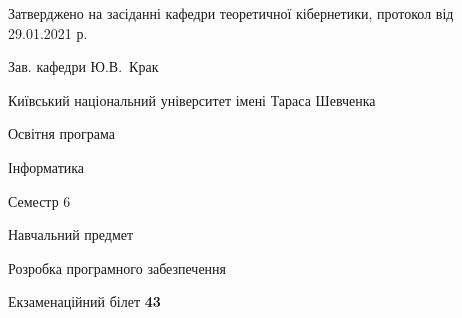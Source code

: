 \documentclass[10pt, ukrainian]{article}
\begin{document}
{\vspace{5mm}\smallskip \begin {small} Затверджено на засіданні кафедри теоретичної кібернетики, протокол  від   29.01.2021 р.\par\smallskip\smallskip
{\parbox {6.5 cm}{Зав. кафедри \dotfill Ю.В.~Крак}} \end{small}}
\newpage

{{\begin {small}\par
{ \center  Київський національний університет імені Тараса Шевченка \par}
{\parbox {5 cm}{Освітня програма \hfill}{\parbox {7 cm}{Інформатика \hfill}}\parbox {6 cm}{\hfill Семестр 6}}\par
{\parbox {5 cm} {Навчальний предмет \hfill}\parbox {7 cm}{Розробка програмного забезпечення \hfill}\parbox {6cm}{\hfill}\par}\vspace{-7pt} \end{small}}{\center Екзаменаційний білет \No \textbf
{ 43 }\par}}
\end{document}
